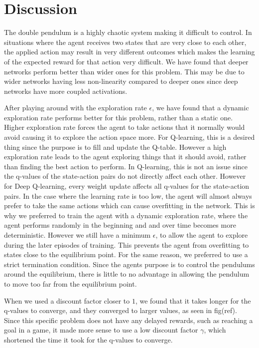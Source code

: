 \documentclass{LTHtwocol} %
\begin{document}
\section{Discussion}
The double pendulum is a highly chaotic system making it difficult to control.
In situations where the agent receives two states that are very close to each other, the applied action may result in very different outcomes which makes the learning of the expected reward for that action very difficult.
We have found that deeper networks perform better than wider ones for this problem.
This may be due to wider networks having less non-linearity compared to deeper ones since deep networks have more coupled activations.

After playing around with the exploration rate $\epsilon$, we have found that a dynamic exploration rate performs better for this problem, rather than a static one.
Higher exploration rate forces the agent to take actions that it normally would avoid causing it to explore the action space more.
For Q-learning, this is a desired thing since the purpose is to fill and update the Q-table.
However a high exploration rate leads to the agent exploring things that it should avoid, rather than finding the best action to perform.
In Q-learning, this is not an issue since the q-values of the state-action pairs do not directly affect each other.
However for Deep Q-learning, every weight update affects all q-values for the state-action pairs.
In the case where the learning rate is too low, the agent will almost always prefer to take the same actions which can cause overfitting in the network.
This is why we preferred to train the agent with a dynamic exploration rate, where the agent performs randomly in the beginning and and over time becomes more deterministic.
However we still have a minimum $\epsilon$, to allow the agent to explore during the later episodes of training.
This prevents the agent from overfitting to states close to the equilibrium point.
For the same reason, we preferred to use a strict termination condition. 
Since the agents purpose is to control the pendulums around the equilibrium, there is little to no advantage in allowing the pendulum to move too far from the equilibrium point.

When we used a discount factor closer to $1$, we found that it takes longer for the q-values to converge, and they converged to larger values, as seen in fig(ref).
Since this specific problem does not have any delayed rewards, such as reaching a goal in a game, it made more sense to use a low discount factor $\gamma$, which shortened the time it took for the q-values to converge.
\end{document}
